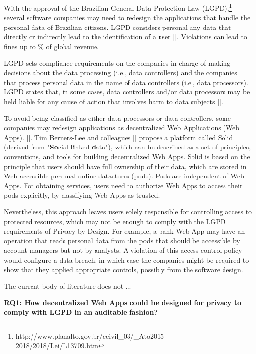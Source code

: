 \documentclass[sigconf]{acmart}
\begin{document}
With the approval of the Brazilian General Data Protection Law (LGPD),\footnote{http://www.planalto.gov.br/ccivil\_03/\_Ato2015-2018/2018/Lei/L13709.htm} several software companies may need to redesign the applications that handle the personal data of Brazilian citizens. LGPD considers personal any data that directly or indirectly lead to the identification of a user []. Violations can lead to fines up to \% of global revenue.

LGPD sets compliance requirements on the companies in charge of making decisions about the data processing (i.e., data controllers) and the companies that process personal data in the name of data controllers (i.e., data processors). LGPD states that, in some cases, data controllers and/or data processors may be held liable for any cause of action that involves harm to data subjects [].

To avoid being classified as either data processors or data controllers, some companies may redesign applications as decentralized Web Applications (Web Apps).  []. Tim Berners-Lee and colleagues [] propose a platform called Solid (derived from "\textbf{So}cial \textbf{li}nked \textbf{d}ata"), which can be described as a set of principles, conventions, and tools for building decentralized Web Apps. Solid is based on the principle that users should have full ownership of their data, which are stored in Web-accessible personal online datastores (pods). Pods are independent of Web Apps. For obtaining services, users need to authorize Web Apps to access their pods explicitly, by classifying Web Apps as trusted.

Nevertheless, this approach leaves users solely responsible for controlling access to protected resources, which may not be enough to comply with the LGPD requirements of Privacy by Design. For example, a bank Web App may have an operation that reads personal data from the pods that should be accessible by account managers but not by analysts. A violation of this access control policy would configure a data breach, in which case the companies might be required to show that they applied appropriate controls, possibly from the software design.

The current body of literature does not ...

\vspace{0.15cm}
\noindent \textbf{RQ1: How decentralized Web Apps could be designed for privacy to comply with LGPD in an auditable fashion?}
\vspace{0.15cm}
\end{document}
